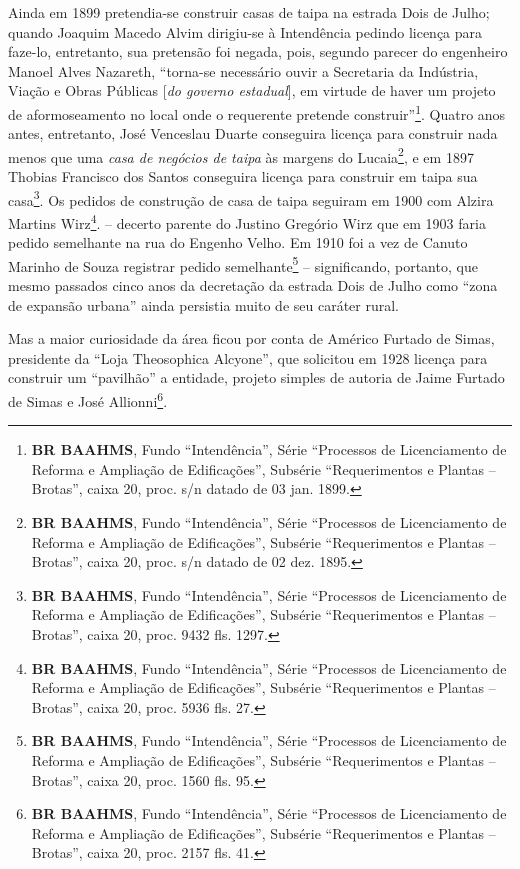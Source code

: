 Ainda em 1899 pretendia-se construir casas de taipa na estrada Dois de Julho; quando Joaquim Macedo Alvim dirigiu-se à Intendência pedindo licença para faze-lo, entretanto, sua pretensão foi negada, pois, segundo parecer do engenheiro Manoel Alves Nazareth, ``torna-se necessário ouvir a Secretaria da Indústria, Viação e Obras Públicas [\textit{do governo estadual}], em virtude de haver um projeto de aformoseamento no local onde o requerente pretende construir''\footnote{\textbf{BR BAAHMS}, Fundo ``Intendência'', Série ``Processos de Licenciamento de Reforma e Ampliação de Edificações'', Subsérie ``Requerimentos e Plantas -- Brotas'', caixa 20, proc. s/n datado de 03 jan. 1899.}. Quatro anos antes, entretanto, José Venceslau Duarte conseguira licença para construir nada menos que uma \textit{casa de negócios de taipa} às margens do Lucaia\footnote{\textbf{BR BAAHMS}, Fundo ``Intendência'', Série ``Processos de Licenciamento de Reforma e Ampliação de Edificações'', Subsérie ``Requerimentos e Plantas -- Brotas'', caixa 20, proc. s/n datado de 02 dez. 1895.}, e em 1897 Thobias Francisco dos Santos conseguira licença para construir em taipa sua casa\footnote{\textbf{BR BAAHMS}, Fundo ``Intendência'', Série ``Processos de Licenciamento de Reforma e Ampliação de Edificações'', Subsérie ``Requerimentos e Plantas -- Brotas'', caixa 20, proc. 9432 fls. 1297.}. Os pedidos de construção de casa de taipa seguiram em 1900 com Alzira Martins Wirz\footnote{\textbf{BR BAAHMS}, Fundo ``Intendência'', Série ``Processos de Licenciamento de Reforma e Ampliação de Edificações'', Subsérie ``Requerimentos e Plantas -- Brotas'', caixa 20, proc. 5936 fls. 27.}. -- decerto parente do Justino Gregório Wirz que em 1903 faria pedido semelhante na rua do Engenho Velho. Em 1910 foi a vez de Canuto Marinho de Souza registrar pedido semelhante\footnote{\textbf{BR BAAHMS}, Fundo ``Intendência'', Série ``Processos de Licenciamento de Reforma e Ampliação de Edificações'', Subsérie ``Requerimentos e Plantas -- Brotas'', caixa 20, proc. 1560 fls. 95.} -- significando, portanto, que mesmo passados cinco anos da decretação da estrada Dois de Julho como ``zona de expansão urbana'' ainda persistia muito de seu caráter rural. 


Mas a maior curiosidade da área ficou por conta de Américo Furtado de Simas, presidente da ``Loja Theosophica Alcyone'', que solicitou em 1928 licença para construir um ``pavilhão'' a entidade, projeto simples de autoria de Jaime Furtado de Simas e José Allionni\footnote{\textbf{BR BAAHMS}, Fundo ``Intendência'', Série ``Processos de Licenciamento de Reforma e Ampliação de Edificações'', Subsérie ``Requerimentos e Plantas -- Brotas'', caixa 20, proc. 2157 fls. 41.}.

